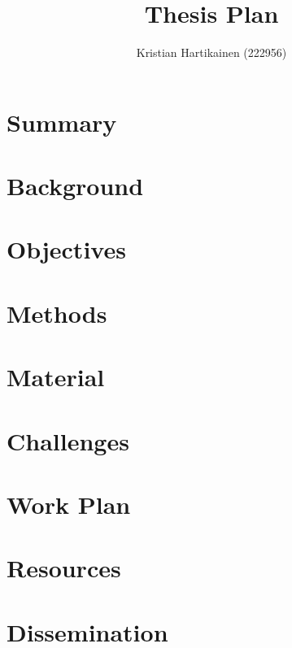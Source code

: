 \documentclass[a4paper,10pt]{article}
\title{Thesis Plan}
\author{Kristian Hartikainen (222956)}
\begin{document}
\maketitle

\pagebreak
\section{Summary}


\pagebreak
\section{Background}


\pagebreak
\section{Objectives}


\pagebreak
\section{Methods}


\pagebreak
\section{Material}


\pagebreak
\section{Challenges}


\pagebreak
\section{Work Plan}


\pagebreak
\section{Resources}


\pagebreak
\section{Dissemination}

\end{document}
